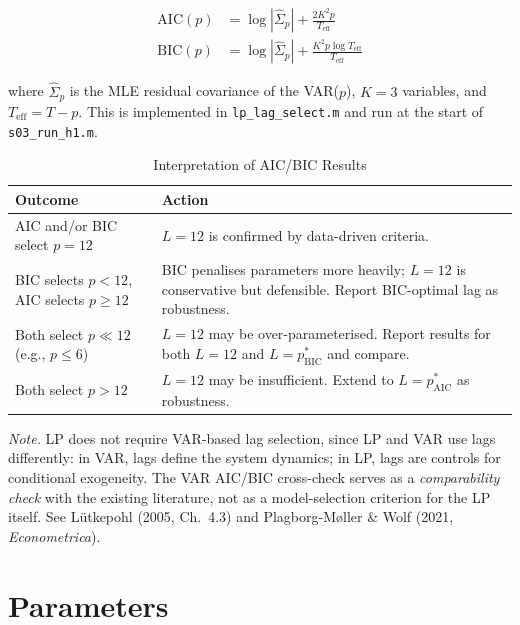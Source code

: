 \documentclass[11pt,a4paper]{article}
\begin{document}
\begin{align}
\text{AIC}(p) &= \log|\hat{\Sigma}_p| + \frac{2K^2 p}{T_{\text{eff}}} \label{eq:aic} \\[4pt]
\text{BIC}(p) &= \log|\hat{\Sigma}_p| + \frac{K^2 p \log T_{\text{eff}}}{T_{\text{eff}}} \label{eq:bic}
\end{align}

\noindent where $\hat{\Sigma}_p$ is the MLE residual covariance of the VAR($p$), $K = 3$ variables, and $T_{\text{eff}} = T - p$. This is implemented in \texttt{lp\_lag\_select.m} and run at the start of \texttt{s03\_run\_h1.m}.

\begin{table}[H]
\centering
\caption{Interpretation of AIC/BIC Results}
\label{tab:lag_interpret}
\begin{tabularx}{\textwidth}{@{}l X@{}}
\toprule
\textbf{Outcome} & \textbf{Action} \\
\midrule
AIC and/or BIC select $p = 12$ & $L = 12$ is confirmed by data-driven criteria. \\
BIC selects $p < 12$, AIC selects $p \geq 12$ & BIC penalises parameters more heavily; $L = 12$ is conservative but defensible. Report BIC-optimal lag as robustness. \\
Both select $p \ll 12$ (e.g., $p \leq 6$) & $L = 12$ may be over-parameterised. Report results for both $L = 12$ and $L = p^*_{\text{BIC}}$ and compare. \\
Both select $p > 12$ & $L = 12$ may be insufficient. Extend to $L = p^*_{\text{AIC}}$ as robustness. \\
\bottomrule
\end{tabularx}
\end{table}

\noindent\textit{Note.} LP does not require VAR-based lag selection, since LP and VAR use lags differently: in VAR, lags define the system dynamics; in LP, lags are controls for conditional exogeneity. The VAR AIC/BIC cross-check serves as a \textit{comparability check} with the existing literature, not as a model-selection criterion for the LP itself. See L\"utkepohl (2005, Ch.~4.3) and Plagborg-M\o ller \& Wolf (2021, \textit{Econometrica}).

\section{Parameters}
\end{document}
